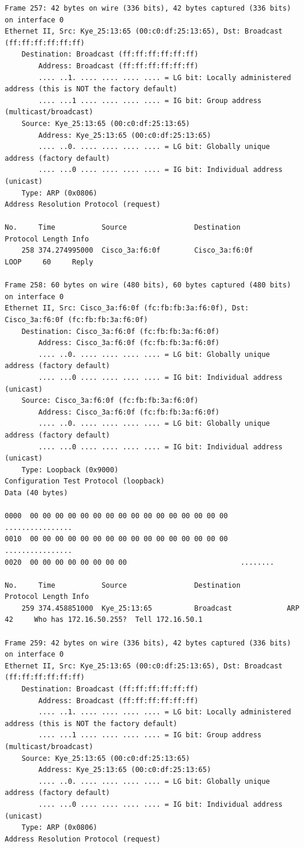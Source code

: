\documentclass[a4paper,11pt]{article}
\begin{document}
\begin{lstlisting}
Frame 257: 42 bytes on wire (336 bits), 42 bytes captured (336 bits) on interface 0
Ethernet II, Src: Kye_25:13:65 (00:c0:df:25:13:65), Dst: Broadcast (ff:ff:ff:ff:ff:ff)
    Destination: Broadcast (ff:ff:ff:ff:ff:ff)
        Address: Broadcast (ff:ff:ff:ff:ff:ff)
        .... ..1. .... .... .... .... = LG bit: Locally administered address (this is NOT the factory default)
        .... ...1 .... .... .... .... = IG bit: Group address (multicast/broadcast)
    Source: Kye_25:13:65 (00:c0:df:25:13:65)
        Address: Kye_25:13:65 (00:c0:df:25:13:65)
        .... ..0. .... .... .... .... = LG bit: Globally unique address (factory default)
        .... ...0 .... .... .... .... = IG bit: Individual address (unicast)
    Type: ARP (0x0806)
Address Resolution Protocol (request)

No.     Time           Source                Destination           Protocol Length Info
    258 374.274995000  Cisco_3a:f6:0f        Cisco_3a:f6:0f        LOOP     60     Reply

Frame 258: 60 bytes on wire (480 bits), 60 bytes captured (480 bits) on interface 0
Ethernet II, Src: Cisco_3a:f6:0f (fc:fb:fb:3a:f6:0f), Dst: Cisco_3a:f6:0f (fc:fb:fb:3a:f6:0f)
    Destination: Cisco_3a:f6:0f (fc:fb:fb:3a:f6:0f)
        Address: Cisco_3a:f6:0f (fc:fb:fb:3a:f6:0f)
        .... ..0. .... .... .... .... = LG bit: Globally unique address (factory default)
        .... ...0 .... .... .... .... = IG bit: Individual address (unicast)
    Source: Cisco_3a:f6:0f (fc:fb:fb:3a:f6:0f)
        Address: Cisco_3a:f6:0f (fc:fb:fb:3a:f6:0f)
        .... ..0. .... .... .... .... = LG bit: Globally unique address (factory default)
        .... ...0 .... .... .... .... = IG bit: Individual address (unicast)
    Type: Loopback (0x9000)
Configuration Test Protocol (loopback)
Data (40 bytes)

0000  00 00 00 00 00 00 00 00 00 00 00 00 00 00 00 00   ................
0010  00 00 00 00 00 00 00 00 00 00 00 00 00 00 00 00   ................
0020  00 00 00 00 00 00 00 00                           ........

No.     Time           Source                Destination           Protocol Length Info
    259 374.458851000  Kye_25:13:65          Broadcast             ARP      42     Who has 172.16.50.255?  Tell 172.16.50.1

Frame 259: 42 bytes on wire (336 bits), 42 bytes captured (336 bits) on interface 0
Ethernet II, Src: Kye_25:13:65 (00:c0:df:25:13:65), Dst: Broadcast (ff:ff:ff:ff:ff:ff)
    Destination: Broadcast (ff:ff:ff:ff:ff:ff)
        Address: Broadcast (ff:ff:ff:ff:ff:ff)
        .... ..1. .... .... .... .... = LG bit: Locally administered address (this is NOT the factory default)
        .... ...1 .... .... .... .... = IG bit: Group address (multicast/broadcast)
    Source: Kye_25:13:65 (00:c0:df:25:13:65)
        Address: Kye_25:13:65 (00:c0:df:25:13:65)
        .... ..0. .... .... .... .... = LG bit: Globally unique address (factory default)
        .... ...0 .... .... .... .... = IG bit: Individual address (unicast)
    Type: ARP (0x0806)
Address Resolution Protocol (request)


\end{lstlisting}
\end{document}
